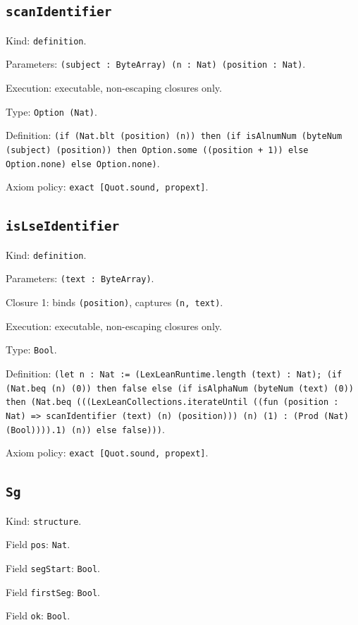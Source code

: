 \documentclass[11pt]{article}
\begin{document}
\subsection*{\texttt{scanIdentifier}}
\noindent Kind: \texttt{definition}.\par
\noindent Parameters: \texttt{(subject : ByteArray) (n : Nat) (position : Nat)}.\par
\noindent Execution: executable, non-escaping closures only.\par
\noindent Type: \texttt{Option (Nat)}.\par
\noindent Definition: \texttt{(if (Nat.blt (position) (n)) then (if isAlnumNum (byteNum (subject) (position)) then Option.some ((position + 1)) else Option.none) else Option.none)}.\par
\noindent Axiom policy: \texttt{exact [Quot.sound, propext]}.\par
\subsection*{\texttt{isLseIdentifier}}
\noindent Kind: \texttt{definition}.\par
\noindent Parameters: \texttt{(text : ByteArray)}.\par
\noindent Closure 1: binds \texttt{(position)}, captures \texttt{(n, text)}.\par
\noindent Execution: executable, non-escaping closures only.\par
\noindent Type: \texttt{Bool}.\par
\noindent Definition: \texttt{(let n : Nat := (LexLeanRuntime.length (text) : Nat); (if (Nat.beq (n) (0)) then false else (if isAlphaNum (byteNum (text) (0)) then (Nat.beq (((LexLeanCollections.iterateUntil ((fun (position : Nat) => scanIdentifier (text) (n) (position))) (n) (1) : (Prod (Nat) (Bool)))).1) (n)) else false)))}.\par
\noindent Axiom policy: \texttt{exact [Quot.sound, propext]}.\par
\subsection*{\texttt{Sg}}
\noindent Kind: \texttt{structure}.\par
\noindent Field \texttt{pos}: \texttt{Nat}.\par
\noindent Field \texttt{segStart}: \texttt{Bool}.\par
\noindent Field \texttt{firstSeg}: \texttt{Bool}.\par
\noindent Field \texttt{ok}: \texttt{Bool}.\par
\end{document}
